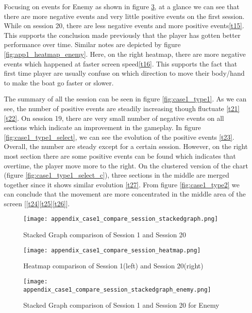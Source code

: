 Focusing on events for Enemy as shown in figure \ref{fig:app1_stacked_enemy}, at a glance we can see that there are more negative events and very little positive events on the first session. While on session 20, there are less negative events and more positive events\ref{t15}. This supports the conclusion made previously that the player has gotten better performance over time. Similar notes are depicted by figure \ref{fig:app1_heatmap_enemy}. Here, on the right heatmap, there are more negative events which happened at faster screen speed\ref{t16}. This supports the fact that first time player are usually confuse on which direction to move their body/hand to make the boat go faster or slower.

The summary of all the session can be seen in figure \ref{fig:case1_type1}. As we can see, the number of positive events are steadily increasing though fluctuate \ref{t21}\ref{t22}. On session 19, there are very small number of negative events on all sections which indicate an improvement in the gameplay. In figure \ref{fig:case1_type1_select}, we can see the evolution of the positive events \ref{t23}. Overall, the number are steady except for a certain session. However, on the right most section there are some positive events can be found which indicates that overtime, the player move more to the right. On the clustered version of the chart (figure \ref{fig:case1_type1_select_c}), three sections in the middle are merged together since it shows similar evolution \ref{t27}. From figure \ref{fig:case1_type2} we can conclude that the movement are more concentrated in the middle area of the screen [\ref{t24}\ref{t25}\ref{t26}].

\begin{figure}
\centering
\texttt{[image: appendix\_case1\_compare\_session\_stackedgraph.png]}
\caption{Stacked Graph comparison of Session 1 and Session 20}
\label{fig:app1_stacked}
\end{figure}

\begin{figure}
\centering
\texttt{[image: appendix\_case1\_compare\_session\_heatmap.png]}
\caption{Heatmap comparison of Session 1(left) and Session 20(right)}
\label{fig:app1_heatmap}
\end{figure}

\begin{figure}
\centering
\texttt{[image: appendix\_case1\_compare\_session\_stackedgraph\_enemy.png]}
\caption{Stacked Graph comparison of Session 1 and Session 20 for Enemy}
\label{fig:app1_stacked_enemy}
\end{figure}

